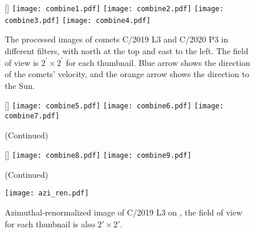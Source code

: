 \begin{figure}
    \centering
    [\linewidth]{
        \texttt{[image: combine1.pdf]}
        \texttt{[image: combine2.pdf]} 
        \texttt{[image: combine3.pdf]}
        \texttt{[image: combine4.pdf]}
    }
    \caption{The processed images of comets C/2019 L3 and C/2020 P3 in different filters, with north at the top and east to the left. The field of view is $ 2^{\prime} \times 2^{\prime} $ for each thumbnail. Blue arrow shows the direction of the comets' velocity, and the orange arrow shows the direction to the Sun. }
    \label{fig:combinedimg}
\end{figure}

\begin{figure}
    \centering
    \ContinuedFloat
    [\linewidth]{
        \texttt{[image: combine5.pdf]}
        \texttt{[image: combine6.pdf]} 
        \texttt{[image: combine7.pdf]} 
    }
    \caption{(Continued)}
\end{figure}

\begin{figure}
    \centering
    \ContinuedFloat
    [\linewidth]{
        \texttt{[image: combine8.pdf]}
        \texttt{[image: combine9.pdf]} 
    }
    \caption{(Continued)}
\end{figure}

\begin{figure}
    \centering
    \texttt{[image: azi\_ren.pdf]}
    \caption{Azimuthal-renormalized image of C/2019 L3 on , the field of view for each thunbnail is also $\ang{;2;}\times\ang{;2;}$. \label{fig:aziren}}
\end{figure}
    
